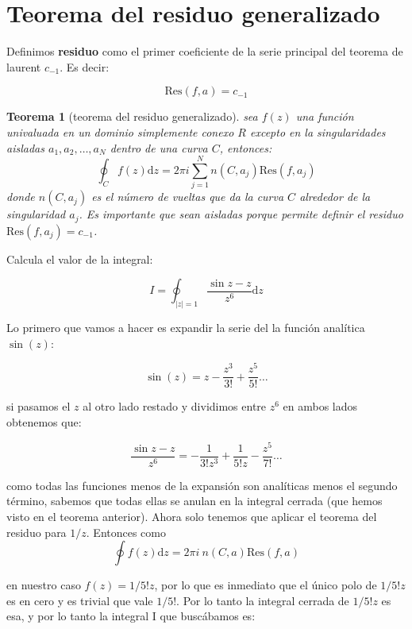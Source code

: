 \documentclass[12pt]{book}
\newcommand{\D}{\mathrm{d}}
\newcommand{\Res}{\mathrm{Res}}
\newtheorem{theorem}{Teorema}[section]
\begin{document}
\section{Teorema del residuo generalizado}

Definimos \textbf{residuo} como el primer coeficiente de la serie principal del teorema de laurent $c_{-1}$. Es decir:

\begin{equation}
\Res (f,a) = c_{-1}
\end{equation}

\begin{theorem}[teorema del residuo generalizado]
sea $f(z)$ una función univaluada en un dominio simplemente conexo $R$ excepto en la singularidades aisladas $a_1,a_2, \ldots, a_N$ dentro de una curva $C$, entonces:
$$ \oint_C f(z) \D z = 2 \pi i \sum_{j=1}^N n(C,a_j) \Res(f,a_j) $$
donde $n(C,a_j)$ es el número de vueltas que da la curva $C$ alrededor de la singularidad $a_j$. Es importante que sean aisladas porque permite definir el residuo $\Res(f,a_j) = c_{-1}$. 
\end{theorem}



\hrulefill

Calcula el valor de la integral:

$$ I = \oint_{|z|=1} \dfrac{\sin z - z}{z^6} \D z $$

Lo primero que vamos a hacer es expandir la serie del la función analítica $\sin (z)$: 

$$ \sin(z) = z - \dfrac{z^3}{3!} + \dfrac{z^5}{5!} \ldots $$


si pasamos el $z$ al otro lado restado y dividimos entre $z^6$ en ambos lados obtenemos que:

\begin{equation}
\dfrac{\sin z - z }{z^6} = - \dfrac{1}{3!  z^3} + \dfrac{1}{5! z} - \dfrac{z^5}{7!} \ldots
\end{equation}

como todas las funciones menos de la expansión son analíticas menos el segundo término, sabemos que todas ellas se anulan en la integral cerrada (que hemos visto en el  teorema anterior). Ahora solo tenemos que aplicar el teorema del residuo para $1/z$. Entonces como
\
$$ \oint f(z) \D z = 2 \pi i \ n(C,a) \Res(f,a) $$

en nuestro caso $f(z)=1/5!z$, por lo que es inmediato que el único polo de $1/5!z$ es en cero y es trivial que vale $1/5!$. Por lo tanto la integral cerrada de $1/5!z$ es esa, y por lo tanto la integral I que buscábamos es:
\end{document}
